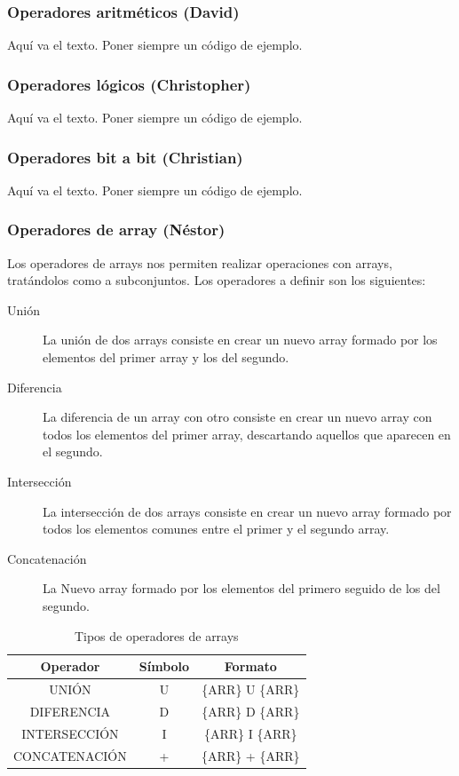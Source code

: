 \documentclass[11pt, english]{article}
\begin{document}
\subsubsection{Operadores aritméticos (David)}
Aquí va el texto. Poner siempre un código de ejemplo.

\subsubsection{Operadores lógicos (Christopher)}
Aquí va el texto. Poner siempre un código de ejemplo.

\subsubsection{Operadores bit a bit (Christian)}
Aquí va el texto. Poner siempre un código de ejemplo.

\subsubsection{Operadores de array (Néstor)}
Los operadores de arrays nos permiten realizar operaciones con arrays, tratándolos como a subconjuntos. Los operadores a definir son los siguientes:
\begin{description}
	\item [Unión] La unión de dos arrays consiste en crear un nuevo array formado por los elementos del primer array y los del segundo.
	\item [Diferencia] La  diferencia de un array con otro consiste en crear un nuevo array con todos los elementos del primer array, descartando aquellos que aparecen en el segundo.
	\item [Intersección] La intersección de dos arrays consiste en crear un nuevo array formado por todos los elementos comunes entre el primer y el segundo array.
	\item [Concatenación] La Nuevo array formado por los elementos del primero seguido de los del segundo.
\end{description}
\begin{table}[h!]
	\begin{center}
		\caption{Tipos de operadores de arrays}
		\label{tab:table3}
		\begin{tabular}{c|c|c}
			\toprule
			\multicolumn{1}{c}{\textbf{Operador}} & \multicolumn{1}{c}{\textbf{Símbolo}} & \multicolumn{1}{c}{\textbf{Formato}}
			\\ \midrule
			UNIÓN                            & U                        & \{ARR\} U \{ARR\}
			\\ \midrule
			DIFERENCIA                             & D             & \{ARR\} D \{ARR\}
			\\ \midrule
			INTERSECCIÓN                            & I                            & \{ARR\} I \{ARR\}
			\\ \midrule
			CONCATENACIÓN                            & +                            & \{ARR\} + \{ARR\}
			\\ \bottomrule
		\end{tabular}
	\end{center}
\end{table}
\end{document}

